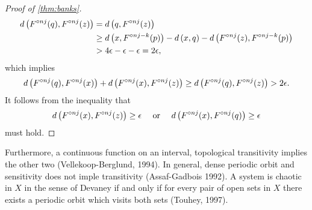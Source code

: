 \documentclass[12pt,draft,twoside]{article}
\begin{document}
\begin{proof}[Proof of \ref{thm:banks}]
\begin{align*}
    d\left( F^{\circ nj}(q), F^{\circ nj}(z) \right) 
    &= d\left( q, F^{\circ nj}(z) \right)  \\
    &\geq  d\left( x, F^{\circ nj-k}(p) \right) - d\left( x,q \right) - d\left( F^{\circ nj}(z), F^{\circ nj - k}(p) \right)  \\
    &> 4\epsilon - \epsilon - \epsilon 
    = 2\epsilon,
  \end{align*}
  which implies
  \begin{equation*}
    d\left( F^{\circ nj}(q), F^{\circ nj}(x) \right) + d\left( F^{\circ nj}(x), F^{\circ nj}(z) \right) 
    \geq d\left( F^{\circ nj}(q), F^{\circ nj}(z) \right)
    > 2\epsilon.
  \end{equation*}
  It follows from the inequality that 
  \begin{equation*}
    d\left( F^{\circ nj}(x), F^{\circ nj}(z) \right) \geq \epsilon \quad\mbox{ or }\quad d\left( F^{\circ nj}(x), F^{\circ nj}(q) \right) \geq \epsilon 
  \end{equation*}
   must hold.

\end{proof}

Furthermore, a continuous function on an interval, topological transitivity implies the other two (Vellekoop-Berglund, 1994).
In general, dense periodic orbit and sensitivity does not imple transitivity (Assaf-Gadbois 1992).
A system is chaotic in $X$ in the sense of Devaney if and only if for every pair of open sets in $X$ there exists a periodic orbit which visits both sets (Touhey, 1997).
\end{document}
